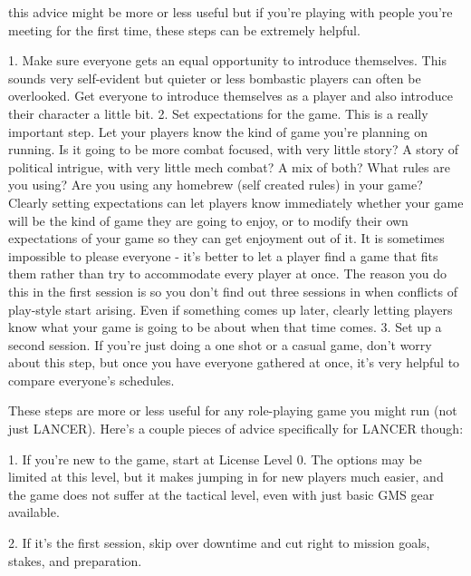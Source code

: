 this advice might be more or less useful but if you’re playing with people you’re meeting for the
first time, these steps can be extremely helpful.


             1.  Make sure everyone gets an equal opportunity to introduce themselves. This
                 sounds very self-evident but quieter or less bombastic players can often be
                 overlooked. Get everyone to introduce themselves as a player and also introduce
                 their character a little bit.
             2.  Set expectations for the game. This is a really important step. Let your players
                 know the kind of game you’re planning on running. Is it going to be more combat
                 focused, with very little story? A story of political intrigue, with very little mech
                 combat? A mix of both? What rules are you using? Are you using any homebrew
                 (self created rules) in your game? Clearly setting expectations can let players
                 know immediately whether your game will be the kind of game they are going to
                 enjoy, or to modify their own expectations of your game so they can get
                 enjoyment out of it. It is sometimes impossible to please everyone - it’s better to
                 let a player find a game that fits them rather than try to accommodate every player
                 at once. The reason you do this in the first session is so you don’t find out three
                 sessions in when conflicts of play-style start arising. Even if something comes up
                 later, clearly letting players know what your game is going to be about when that
                 time comes.
             3.  Set up a second session. If you’re just doing a one shot or a casual game, don’t
                 worry about this step, but once you have everyone gathered at once, it’s very
                 helpful to compare everyone’s schedules.

These steps are more or less useful for any role-playing game you might run (not just LANCER).
Here’s a couple pieces of advice specifically for LANCER though:


         	1. If you’re new to the game, start at License Level 0. The options may be limited at this
         level, but it makes jumping in for new players much easier, and the game does not suffer
         at the tactical level, even with just basic GMS gear available.

         	2. If it’s the first session, skip over downtime and cut right to mission goals, stakes, and
         preparation.

